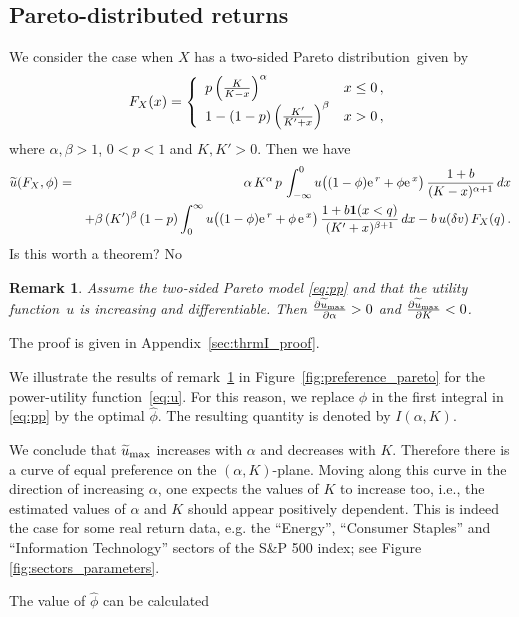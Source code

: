 \documentclass[11pt,a4]{amsart}
\newcommand{\pd}{\partial}
\newcommand{\red}{\color{darkred}}
\newcommand{\blue}{\color{darkblue}}
\newcommand{\ex}{{\rm e}\,}
\newtheorem{remark}[lemma]{Remark}
\newcommand{\beam}{\begin{eqnarray}}
\newcommand{\eeam}{\end{eqnarray}\noindent}
\newcommand{\wt}{\widetilde}
\newcommand{\fct}{function}
\newcommand{\ds}{distribution}
\newcommand{\1}{{\mathbf 1}}
\begin{document}
\subsection{Pareto-distributed returns}\label{sec:pareto_tail}
We consider the case when $X$ has a two-sided Pareto \ds\ given by
\beam\label{eq:pareto}
  F_X(x) = \left\{
  \begin{array}{ll}
    p \left(
    {K \over K - x}
    \right)^\alpha & x \leq 0 \,,\\
    1 - (1 - p) \left(
    {K' \over K' + x}
    \right)^\beta & x > 0\,,
  \end{array}
  \right.
\eeam
where 
$\alpha, \beta > 1$, $0 < p < 1$ and $K,K' > 0$. Then we have
\beam\label{eq:xxie1.0}
 \wt u(F_X,\phi)\nonumber
  &=&
  \alpha\, K^\alpha\,  p\,
  \int_{-\infty}^0
  u\big( (1 - \phi) \ex^r + \phi \ex^x \big)\,
  {1 + b \over (K - x)^{\alpha + 1}} \,dx\\
    &&+
  \beta \,(K')^\beta\, (1 - p)
  \int_{0}^\infty
  u\big( (1 - \phi) \ex^r + \phi\, \ex^x \big)\,
  {1 + b \1(x < q) \over (K' + x)^{\beta + 1}} \,dx 
  - b \,u(\delta v) \,F_X(q) \,.\label{eq:pp}
\eeam
    {\red Is this worth a theorem?}
    {\blue No}
\begin{remark}\label{thrm:I}
 Assume the two-sided Pareto model \eqref{eq:pp} and that the utility \fct\ $u$ is increasing and differentiable. Then
$\frac{\pd \wt u_{\rm max}}{\pd \alpha} > 0$ and $\frac{\pd \wt u_{\rm max}}{\pd K} < 0$.
\end{remark}
The proof is given in Appendix~\ref{sec:thrmI_proof}. 
\par
We illustrate the results of remark~\ref{thrm:I} in Figure~\ref{fig:preference_pareto} for the power-utility
\fct\ \eqref{eq:u}.
For this reason, we replace $\phi$ in the first integral in \eqref{eq:pp} by the optimal $\hat\phi$. The resulting
quantity is denoted by $I(\alpha, K)$.
\par
We conclude that
$\wt u_{\rm max}$ increases with $\alpha$ and decreases with $K$. Therefore there is a curve of
equal preference on the $(\alpha, K)$-plane. Moving along this
curve in the direction of increasing $\alpha$, one expects the values
of $K$ to increase too, i.e., the estimated values of $\alpha$ and $K$
should appear positively dependent. This is indeed the case for some
real return data, e.g. the ``Energy'', ``Consumer Staples'' and
``Information Technology'' sectors of the S\&P 500 index; see 
Figure \ref{fig:sectors_parameters}.
\par
The value of $\hat\phi$ can be calculated
\end{document}
